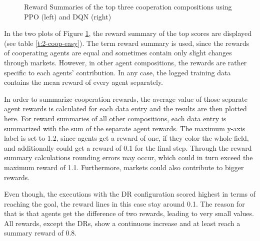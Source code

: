 \begin{figure}[hpbt]
    \centering
    \hspace{0.01\textwidth}
    \caption[Reward Summaries of the Top Cooperation Modes in a 5x5 Environment]{Reward Summaries of the top three cooperation compositions using PPO (left) and DQN (right)}
    \label{fig:multipic_plots_coop_easy} 
\end{figure}

In the two plots of Figure \ref{fig:multipic_plots_coop_easy}, the reward summary of the top scores are displayed (see table \ref{t:2-coop-easy}). The term reward summary is used, since the rewards of cooperating agents are equal and sometimes contain only slight changes through markets. However, in other agent compositions, the rewards are rather specific to each agents' contribution. In any case, the logged training data contains the mean reward of every agent separately. 

In order to summarize cooperation rewards, the average value of those separate agent rewards is calculated for each data entry and the results are then plotted here. For reward summaries of all other compositions, each data entry is summarized with the sum of the separate agent rewards. The maximum y-axis label is set to 1.2, since agents get a reward of one, if they color the whole field, and additionally could get a reward of 0.1 for the final step. Through the reward summary calculations rounding errors may occur, which could in turn exceed the maximum reward of 1.1. Furthermore, markets could also contribute to bigger rewards. 

Even though, the executions with the DR configuration scored highest in terms of reaching the goal, the reward lines in this case stay around 0.1. The reason for that is that agents get the difference of two rewards, leading to very small values. All rewards, except the DRs, show a continuous increase and at least reach a summary reward of 0.8. 

